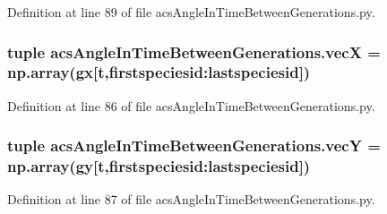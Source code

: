 Definition at line 89 of file acs\-Angle\-In\-Time\-Between\-Generations.\-py.

\hypertarget{a00090_ada59022b084d32f959c70d980c256873}{
\subsubsection[{vec\-X}]{\setlength{\rightskip}{0pt plus 5cm}tuple acs\-Angle\-In\-Time\-Between\-Generations.\-vec\-X = np.\-array(gx\mbox{[}t,firstspeciesid\-:lastspeciesid\mbox{]})}}\label{a00090_ada59022b084d32f959c70d980c256873}


Definition at line 86 of file acs\-Angle\-In\-Time\-Between\-Generations.\-py.

\hypertarget{a00090_af9dceee4ca99d15e7b95905f674ceda5}{
\subsubsection[{vec\-Y}]{\setlength{\rightskip}{0pt plus 5cm}tuple acs\-Angle\-In\-Time\-Between\-Generations.\-vec\-Y = np.\-array(gy\mbox{[}t,firstspeciesid\-:lastspeciesid\mbox{]})}}\label{a00090_af9dceee4ca99d15e7b95905f674ceda5}


Definition at line 87 of file acs\-Angle\-In\-Time\-Between\-Generations.\-py.

